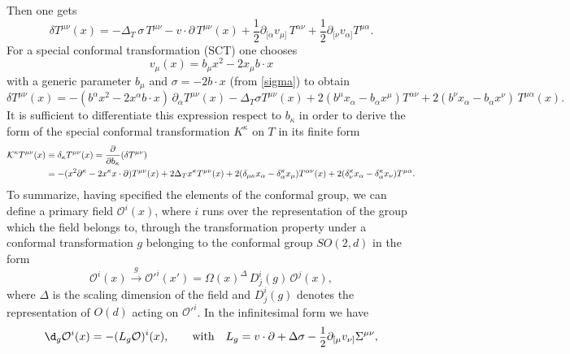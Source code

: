 \documentclass[a4paper,11pt,openright,twoside]{book}
\newcommand{\sdfrac}[2]{\mbox{\small$\displaystyle\frac{#1}{#2}$}}
\numberwithin{equation}{section}
\begin{document}
Then one gets 
\begin{equation}
	\delta T^{\mu\nu}(x)=-\Delta_T\, \sigma\, T^{\mu\nu} -v\cdot \partial \,T^{\mu\nu}(x) +
	\frac{1}{2}\partial_{[\alpha }v_{\mu]}\,T^{\alpha\nu} +\frac{1}{2}\partial_{[\nu }v_{\alpha]}T^{\mu\alpha}.
\end{equation}
For a special conformal transformation (SCT) one chooses 
\begin{equation}
	v_{\mu}(x)=b_\mu x^2 -2 x_\mu b\cdot x
\end{equation}
with a generic parameter $b_\mu$ and  $\sigma=-2 b\cdot x$ (from \ref{sigma}) to obtain
\begin{equation}
	\delta T^{\mu\nu}(x)=-(b^\alpha x^2 -2 x^\alpha b\cdot x )\, \partial_\alpha  T^{\mu\nu}(x)   - \Delta_T \sigma T^{\mu\nu}(x)+
	2(b^\mu x_\alpha- b_\alpha x^\mu)T^{\alpha\nu} + 2 (b^\nu x_\alpha -b_\alpha x^\nu)\, T^{\mu\alpha}(x).
\end{equation}
It is sufficient to differentiate this expression respect to $b_\kappa$ in order to derive the form of the special conformal transformation $K^\kappa$ on $T$ in its finite form 
\begin{align}
	\mathcal{K}^\kappa T^{\mu\nu}(x)&\equiv\delta_\kappa T^{\mu\nu}(x) =\frac{\partial}{\partial b_\kappa} (\delta T^{\mu\nu})\notag\\
	&= -(x^2 \partial^\kappa - 2 x^\kappa x\cdot \partial) T^{\mu\nu}(x) + 2\Delta_T x^\kappa T^{\mu\nu}(x) +
	2(\delta_{\mu\kappa}x_\alpha -\delta_{\alpha}^{\kappa}x_\mu) T^{\alpha\nu}(x) + 2 (\delta^\kappa_\nu x_{\alpha} -\delta_\alpha^\kappa x_\nu )T^{\mu\alpha}. 
	\label{ith}
\end{align}
To summarize, having specified the elements of the conformal group, we can define a primary field $\mathcal{O}^i(x)$, where $i$ runs over the representation of the group which the field belongs to, through the transformation property under a conformal transformation $g$ belonging to the conformal group $SO(2,d)$ in the form
\begin{equation}\label{spintransf}
	\mathcal{O}^i(x)\xrightarrow{g}\mathcal{O}'^i(x')=\Omega(x)^\Delta\,D^i_j(g)\,\mathcal{O}^j(x),
\end{equation}
where $\Delta$ is the scaling dimension of the field and $D^i_j(g)$ denotes the representation of $O(d)$ acting on $\mathcal{O}'^i$. In the infinitesimal form we have
\begin{equation}
	\d_g\mathcal{O}^i(x)=-(L_g\mathcal{O})^i(x),\qquad \text{with}\quad L_g=v\cdot \partial+\Delta\sigma-\sdfrac{1}{2}\partial_{[\mu}v_{\nu]}\Sigma^{\mu\nu},
\end{equation}
\end{document}
